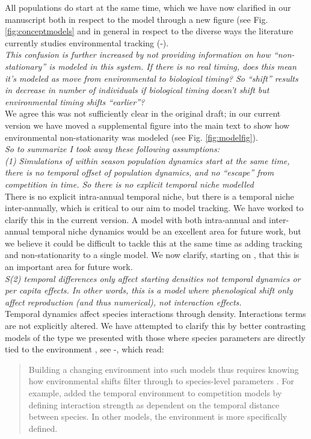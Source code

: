 \documentclass[11pt]{article}
\begin{document}
All populations do start at the same time, which we have now clarified in our manuscript both in respect to the model through a new figure (see Fig. \ref{fig:conceptmodels} and in general in respect to the diverse ways the literature currently studies environmental tracking (-).\\ 

\emph{This confusion is further increased by not providing information on how ``non-stationary'' is
modeled in this system. If there is no real timing, does this mean it's modeled as move from
environmental to biological timing? So ``shift'' results in decrease in number of individuals
if biological timing doesn't shift but environmental timing shifts “earlier”?}\\

We agree this was not sufficiently clear in the original draft; in our current version we have moved a supplemental figure into the main text to show how environmental non-stationarity was modeled (see Fig. \ref{fig:modelfig}). \\

\emph{So to summarize I took away these following assumptions:\\
(1)     Simulations of within season population dynamics start at the same time, there is no
temporal offset of population dynamics, and no ``escape'' from competition in time. So there is
no explicit temporal niche modelled}\\

There is no explicit intra-annual temporal niche, but there is a temporal niche inter-annually, which is critical to our aim to model tracking. We have worked to clarify this in the current version. A model with both intra-annual and inter-annual temporal niche dynamics would be an excellent area for future work, but we believe it could be difficult to tackle this at the same time as adding tracking and non-stationarity to a single model. We now clarify, starting on , that this is an important area for future work. \\

\emph{S(2)     temporal differences only affect starting densities not temporal dynamics or per
capita effects. In other words, this is a model where phenological shift only affect
reproduction (and thus numerical), not interaction effects.}\\

Temporal dynamics affect species interactions through density. Interactions terms are not explicitly altered. We have attempted to clarify this by better contrasting models of the type we presented with those where species parameters are directly tied to the environment \citet{volkerass}, see -, which read:
\begin{quote}
Building a changing environment into such models thus requires knowing how environmental shifts filter through to species-level parameters \citep{Tuljapurkar2009}. For example, \citet{volkerass} added the temporal environment to competition models by defining interaction strength as dependent on the temporal distance between species. In other models, the environment is more specifically defined. 
\end{quote}
\end{document}
